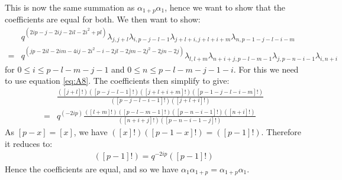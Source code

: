\documentclass[]{article}
\begin{document}
This is now the same summation as $\alpha_{1+p}\alpha_{1}$, hence we want to show that the coefficients are equal for both. We then want to show:
\begin{align*}
& q^{(2ip-j-2ij-2il-2i^{2}+pl)}\lambda_{j,j+l}\lambda_{i,p-j-l-1}\lambda_{j+l+i,j+l+i+m}\lambda_{n,p-1-j-l-i-m}\\
=& q^{(jp-2il-2im-4ij-2i^{2}-i-2jl-2jm-2j^{2}-2jn-2j)}\lambda_{l,l+m}\lambda_{n+i+j,p-l-m-1}\lambda_{j,p-n-i-1}\lambda_{i,n+i}
\end{align*}
for $0\leq i\leq p-l-m-j-1$ and $0\leq n\leq p-l-m-j-1-i$. For this we need to use equation \ref{eq:A8}.
The coefficients then simplify to give:
\begin{align*}
&\frac{([j+l]!)([p-j-l-1]!)([j+l+i+m]!)([p-1-j-l-i-m]!)}{([p-j-l-i-1]!)([j+l+i]!)}\\
=& q^{(-2ip)}\frac{([l+m]!)([p-l-m-1]!)([p-n-i-1]!)([n+i]!)}{([n+i+j]!)([p-n-i-1-j]!)}
\end{align*}
As $[p-x]=[x]$, we have $([x]!)([p-1-x]!)=([p-1]!)$. Therefore it reduces to:
\begin{align*}
([p-1]!)=q^{-2ip}([p-1]!)
\end{align*}
Hence the coefficients are equal, and so we have $\alpha_{1}\alpha_{1+p}=\alpha_{1+p}\alpha_{1}$.
\end{document}
